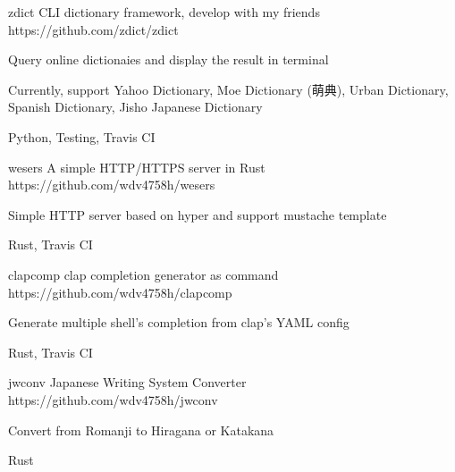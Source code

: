 
\begin{cvopensources}


  \cvopensource
    {zdict}
    {CLI dictionary framework, develop with my friends}
    {https://github.com/zdict/zdict}
    {
      \begin{cvitems}
        \item {Query online dictionaies and display the result in terminal}
        \item {Currently, support Yahoo Dictionary, Moe Dictionary (萌典), Urban Dictionary, Spanish Dictionary, Jisho Japanese Dictionary}
      \end{cvitems}
    }
    {Python, Testing, Travis CI}

  \cvopensource
    {wesers}   %
    {A simple HTTP/HTTPS server in Rust}  %
    {https://github.com/wdv4758h/wesers}
    {
      \begin{cvitems}
        \item {Simple HTTP server based on hyper and support mustache template}
      \end{cvitems}
    }
    {Rust, Travis CI}

  \cvopensource
    {clapcomp}   %
    {clap completion generator as command}  %
    {https://github.com/wdv4758h/clapcomp}
    {
      \begin{cvitems}
      \item {Generate multiple shell's completion from clap's YAML config}
      \end{cvitems}
    }
    {Rust, Travis CI}

  \cvopensource
    {jwconv}   %
    {Japanese Writing System Converter}  %
    {https://github.com/wdv4758h/jwconv}
    {
      \begin{cvitems}
        \item {Convert from Romanji to Hiragana or Katakana}
      \end{cvitems}
    }
    {Rust}


\end{cvopensources}
